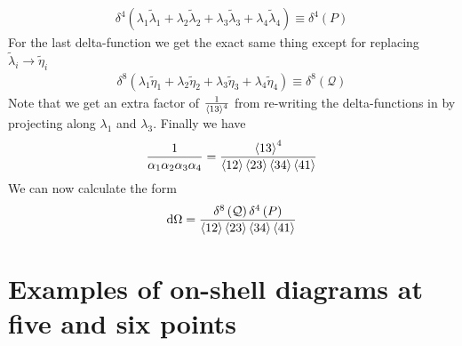 \documentclass[letter,11pt]{article}
\begin{document}
\begin{equation}
	\begin{aligned}
		\delta^{4}(\lambda_1\tilde\lambda_1+\lambda_2\tilde\lambda_2+\lambda_3\tilde\lambda_3+\lambda_4\tilde\lambda_4)\equiv \delta^{4}\left(P\right)
	\end{aligned}
\end{equation}
For the last delta-function we get the exact same thing except for replacing $\tilde \lambda_i\to \tilde \eta_i$
\begin{equation}
	\begin{aligned}
		\delta^{8}(\lambda_1\tilde\eta_1+\lambda_2\tilde\eta_2+\lambda_3\tilde\eta_3+\lambda_4\tilde\eta_4)\equiv \delta^{8}\left(\mathcal{Q}\right)
	\end{aligned}
\end{equation}
Note that we get an extra factor of $\frac{1}{\expval{13}^4}$ from re-writing the delta-functions in by projecting along $\lambda_1$ and $\lambda_3$.
 Finally we have
\begin{equation}
	\begin{aligned}
		\frac{1}{\alpha_1 \alpha_2 \alpha_3 \alpha_4}=\frac{\expval{13}^4}{\expval{12}\expval{23}\expval{34}\expval{41}}
	\end{aligned}
\end{equation}
We can now calculate the form
\begin{equation}
	\begin{aligned}
		\dd \Omega =
		\frac{\delta^{8}\left(\mathcal{Q}\right)\delta^{4}\left(P\right)}{\expval{12}\expval{23}\expval{34}\expval{41}}
	\end{aligned}
\end{equation}
\newpage
\section{Examples of on-shell diagrams at five and six points}
\end{document}
